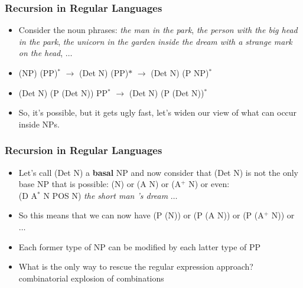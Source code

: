 \begin{frame}
\frametitle{Recursion in Regular Languages}
\begin{itemize}
\item Consider the noun phrases: {\em the man in the park}, {\em the person with the big head in the park}, {\em the unicorn in the garden inside the dream with a strange mark on the head}, $\ldots$
\item (NP) (PP)$^\ast$ $\rightarrow$ (Det N) (PP)$\ast$ $\rightarrow$ (Det N) (P NP)$^\ast$
\item (Det N) (P (Det N)) PP$^\ast$ $\rightarrow$ (Det N) (P (Det N))$^\ast$
\item So, it's possible, but it gets ugly fast, let's widen our view of what can occur inside NPs.
\end{itemize}

\end{frame}

\begin{frame}
\frametitle{Recursion in Regular Languages}
\begin{itemize}
\item Let's call (Det N) a {\bf basal} NP and now consider that (Det N) is not the only base NP that is possible: (N) or (A N) or (A$^+$ N) or even: \\
(D A$^\ast$ N POS N) {\em the short man 's dream} $\ldots$
\item So this means that we can now have (P (N)) or (P (A N)) or (P (A$^+$ N)) or $\ldots$
\item Each former type of NP can be modified by each latter type of PP
\item What is the only way to rescue the regular expression approach?  \\
{\color{red} combinatorial explosion of combinations}
\end{itemize}

\end{frame}


